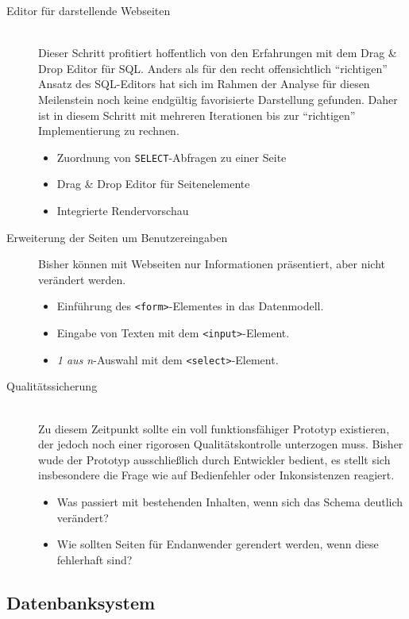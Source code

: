 \begin{description}
\item [Editor für darstellende Webseiten] \hfill \\
  Dieser Schritt profitiert hoffentlich von den Erfahrungen mit dem Drag \& Drop Editor für SQL. Anders als für den recht offensichtlich "`richtigen"' Ansatz des SQL-Editors hat sich im Rahmen der Analyse für diesen Meilenstein noch keine endgültig favorisierte Darstellung gefunden. Daher ist in diesem Schritt mit mehreren Iterationen bis zur "`richtigen"' Implementierung zu rechnen.
  \begin{itemize}[noitemsep]
  \item Zuordnung von \texttt{SELECT}-Abfragen zu einer Seite
  \item Drag \& Drop Editor für Seitenelemente
  \item Integrierte Rendervorschau
  \end{itemize}
  
\item[Erweiterung der Seiten um Benutzereingaben]
  Bisher können mit Webseiten nur Informationen präsentiert, aber nicht verändert werden.
  \begin{itemize}[noitemsep]
  \item Einführung des \texttt{<form>}-Elementes in das Datenmodell.
  \item Eingabe von Texten mit dem \texttt{<input>}-Element.
  \item \textit{1 aus n}-Auswahl mit dem \texttt{<select>}-Element.
  \end{itemize}
  
\item [Qualitätssicherung] \hfill \\
  Zu diesem Zeitpunkt sollte ein voll funktionsfähiger Prototyp existieren, der jedoch noch einer rigorosen Qualitätskontrolle unterzogen muss. Bisher wude der Prototyp ausschließlich durch Entwickler bedient, es stellt sich insbesondere die Frage wie \idename{} auf Bedienfehler oder Inkonsistenzen reagiert.
  \begin{itemize}[noitemsep]
  \item Was passiert mit bestehenden Inhalten, wenn sich das Schema deutlich verändert?
  \item Wie sollten Seiten für Endanwender gerendert werden, wenn diese fehlerhaft sind?
  \end{itemize}
\end{description}

\subsection{Datenbanksystem}
\label{sec:implementation-database-system}

